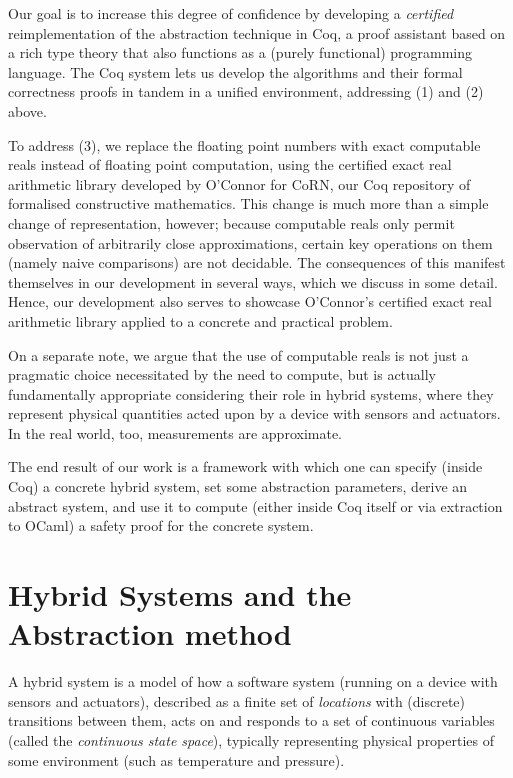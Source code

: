 \documentclass[runningheads]{llncs}
\begin{document}
Our goal is to increase this degree of confidence by developing a \emph{certified} reimplementation of the abstraction technique in Coq, a proof assistant based on a rich type theory that also functions as a (purely functional) programming language. The Coq system lets us develop the algorithms and their formal correctness proofs in tandem in a unified environment, addressing (1) and (2) above.

To address (3), we replace the floating point numbers with exact
computable reals instead of floating point computation, using the
certified exact real arithmetic library developed by O'Connor
\cite{oconnor} for CoRN, our Coq repository of formalised constructive
mathematics. \cite{corn} This change is much more than a simple change
of representation, however; because computable reals only permit
observation of arbitrarily close approximations, certain key
operations on them (namely naive comparisons) are not decidable. The
consequences of this manifest themselves in our development in several
ways, which we discuss in some detail. Hence, our development also
serves to showcase O'Connor's certified exact real arithmetic library
applied to a concrete and practical problem.

On a separate note, we argue that the use of computable reals is not just a pragmatic choice necessitated by the need to compute, but is actually fundamentally appropriate considering their role in hybrid systems, where they represent physical quantities acted upon by a device with sensors and actuators. In the real world, too, measurements are approximate.

The end result of our work is a framework with which one can specify (inside Coq) a concrete hybrid system, set some abstraction parameters, derive an abstract system, and use it to compute (either inside Coq itself or via extraction to OCaml) a safety proof for the concrete system.

\section{Hybrid Systems and the Abstraction method}
\label{sec:hybsys}
A hybrid system is a model of how a software system (running on a device with sensors and actuators), described as a finite set of \emph{locations}
with (discrete) transitions between them, acts
on and responds to a set of continuous variables (called the
\emph{continuous state space}), typically representing physical
properties of some environment (such as temperature and pressure).
\end{document}
